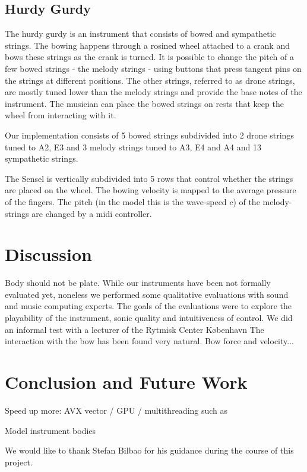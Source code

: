 \documentclass{article}
\begin{document}
\subsection{Hurdy Gurdy}
The hurdy gurdy is an instrument that consists of bowed and sympathetic strings. The bowing happens through a rosined wheel attached to a crank and bows these strings as the crank is turned. It is possible to change the pitch of a few bowed strings - the melody strings - using buttons that press tangent pins on the strings at different positions. The other strings, referred to as drone strings, are mostly tuned lower than the melody strings and provide the base notes of the instrument. The musician can place the bowed strings on rests that keep the wheel from interacting with it. 

Our implementation consists of 5 bowed strings subdivided into 2 drone strings tuned to A2, E3 and 3 melody strings tuned to A3, E4 and A4 and 13 sympathetic strings. 

The Sensel is vertically subdivided into 5 rows that control whether the strings are placed on the wheel. The bowing velocity is mapped to the average pressure of the fingers. The pitch (in the model this is the wave-speed $c$) of the melody-strings are changed by a midi controller.


\section{Discussion}\label{sec:discussion}

Body should not be plate.
While our instruments have been not formally evaluated yet, noneless we performed some qualitative evaluations with sound and music computing experts.
The goals of the evaluations were to explore the playability of the instrument, sonic quality and intuitiveness of control.
We did an informal test with a lecturer of the Rytmisk Center København 
The interaction with the bow has been found very natural. Bow force and velocity... 

\section{Conclusion and Future Work}\label{sec:conclusion}
Speed up more: AVX vector / GPU / multithreading such as \cite{Webb2015}

Model instrument bodies


\begin{acknowledgments}
We would like to thank Stefan Bilbao for his guidance during the course of this project. 
\end{acknowledgments} 


\end{document}
